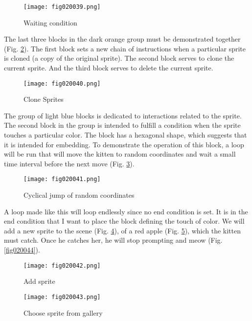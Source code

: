 \begin{figure}[H]
   \centering
   \texttt{[image: fig020039.png]}
   \caption{Waiting condition}
\label{fig020039}
\end{figure}

The last three blocks in the dark orange group must be demonstrated together (Fig. \ref{fig020040}). The first block sets a new chain of instructions when a particular sprite is cloned (a copy of the original sprite). The second block serves to clone the current sprite. And the third block serves to delete the current sprite.

\begin{figure}[H]
   \centering
   \texttt{[image: fig020040.png]}
   \caption{Clone Sprites}
\label{fig020040}
\end{figure}

The group of light blue blocks is dedicated to interactions related to the sprite. The second block in the group is intended to fulfill a condition when the sprite touches a particular color. The block has a hexagonal shape, which suggests that it is intended for embedding. To demonstrate the operation of this block, a loop will be run that will move the kitten to random coordinates and wait a small time interval before the next move (Fig. \ref{fig020041}).

\begin{figure}[H]
   \centering
   \texttt{[image: fig020041.png]}
   \caption{Cyclical jump of random coordinates}
\label{fig020041}
\end{figure}

A loop made like this will loop endlessly since no end condition is set. It is in the end condition that I want to place the block defining the touch of color. We will add a new sprite to the scene (Fig. \ref{fig020042}), of a red apple (Fig. \ref{fig020043}), which the kitten must catch. Once he catches her, he will stop prompting and meow (Fig. \ref{fig020044}).

\begin{figure}[H]
   \centering
   \texttt{[image: fig020042.png]}
   \caption{Add sprite}
\label{fig020042}
\end{figure}

\begin{figure}[H]
   \centering
   \texttt{[image: fig020043.png]}
   \caption{Choose sprite from gallery}
\label{fig020043}
\end{figure}

